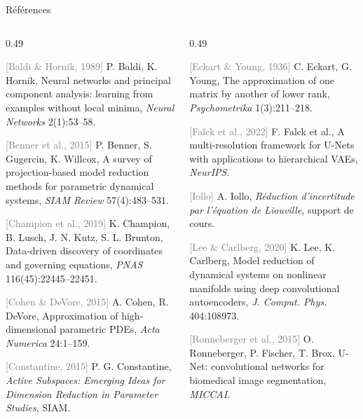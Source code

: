 \documentclass[aspectratio=169, 11pt]{beamer}
\begin{document}
\begin{frame}{Références}
  \scriptsize\setlength{\parskip}{4pt}
  \begin{columns}[T]
    \begin{column}{0.49\textwidth}\raggedright
      \textcolor{gray}{[Baldi \& Hornik, 1989]} P. Baldi, K. Hornik, Neural networks and principal component analysis: learning from examples without local minima, \emph{Neural Networks} 2(1):53--58.\par
      \textcolor{gray}{[Benner et al., 2015]} P. Benner, S. Gugercin, K. Willcox, A survey of projection-based model reduction methods for parametric dynamical systems, \emph{SIAM Review} 57(4):483--531.\par
      \textcolor{gray}{[Champion et al., 2019]} K. Champion, B. Lusch, J. N. Kutz, S. L. Brunton, Data-driven discovery of coordinates and governing equations, \emph{PNAS} 116(45):22445--22451.\par
      \textcolor{gray}{[Cohen \& DeVore, 2015]} A. Cohen, R. DeVore, Approximation of high-dimensional parametric PDEs, \emph{Acta Numerica} 24:1--159.\par
      \textcolor{gray}{[Constantine, 2015]} P. G. Constantine, \emph{Active Subspaces: Emerging Ideas for Dimension Reduction in Parameter Studies}, SIAM.\par
    \end{column}
    \begin{column}{0.49\textwidth}\raggedright
      \textcolor{gray}{[Eckart \& Young, 1936]} C. Eckart, G. Young, The approximation of one matrix by another of lower rank, \emph{Psychometrika} 1(3):211--218.\par
      \textcolor{gray}{[Falck et al., 2022]} F. Falck et al., A multi-resolution framework for U-Nets with applications to hierarchical VAEs, \emph{NeurIPS}.\par
      \textcolor{gray}{[Iollo]} A. Iollo, \emph{Réduction d'incertitude par l'équation de Liouville}, support de cours.\par
      \textcolor{gray}{[Lee \& Carlberg, 2020]} K. Lee, K. Carlberg, Model reduction of dynamical systems on nonlinear manifolds using deep convolutional autoencoders, \emph{J. Comput. Phys.} 404:108973.\par
      \textcolor{gray}{[Ronneberger et al., 2015]} O. Ronneberger, P. Fischer, T. Brox, U-Net: convolutional networks for biomedical image segmentation, \emph{MICCAI}.\par
    \end{column}
  \end{columns}
\end{frame}
\end{document}
